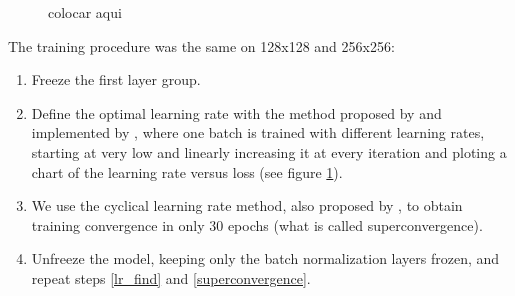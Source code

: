 \documentclass[conference]{IEEEtran}
\begin{document}
\begin{figure}
\centering
{}
\hfil
{}
\caption{colocar aqui}\label{lr_find_chart}
\end{figure}

The training procedure was the same on 128x128 and 256x256:
\begin{enumerate}
  \item Freeze the first layer group.
  \item \label{lr_find}Define the optimal learning rate with the method proposed by \cite{leslie} and implemented by \cite{fastai}, where one batch is trained with different learning rates, starting at very low and linearly increasing it at every iteration and ploting a chart of the learning rate versus loss (see figure \ref{lr_find_chart}).
  \item \label{superconvergence}We use the cyclical learning rate method, also proposed by \cite{leslie}, to obtain training convergence in only 30 epochs (what is called superconvergence).
  \item Unfreeze the model, keeping only the batch normalization layers frozen, and repeat steps \ref{lr_find} and \ref{superconvergence}.
\end{enumerate}
\end{document}
